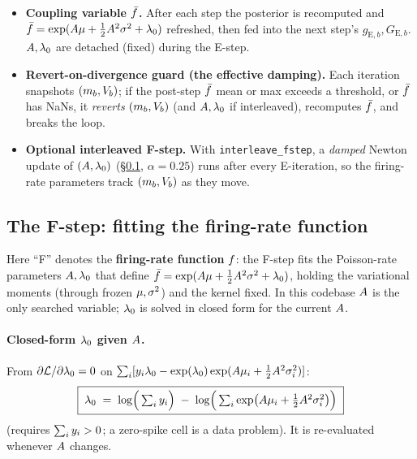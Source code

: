 \begin{itemize}[leftmargin=1.4em,itemsep=1pt]
  \item \textbf{Coupling variable $\bar{f}$.} After each step the posterior is
        recomputed and $\bar{f}=\exp(A\mu+\tfrac12A^2\sigma^{2}+\lambda_{0})$
        refreshed, then fed into the next step's $g_{\mathrm E,b},G_{\mathrm E,b}$.
        $A,\lambda_{0}$ are detached (fixed) during the E-step.
  \item \textbf{Revert-on-divergence guard (the effective damping).} Each iteration
        snapshots $(m_{b},V_{b})$; if the post-step $\bar{f}$ mean or max exceeds a
        threshold, or $\bar{f}$ has NaNs, it \emph{reverts} $(m_{b},V_{b})$ (and
        $A,\lambda_{0}$ if interleaved), recomputes $\bar{f}$, and breaks the loop.
  \item \textbf{Optional interleaved F-step.} With \texttt{interleave\_fstep}, a
        \emph{damped} Newton update of $(A,\lambda_{0})$ (\S\ref{subsec:fstep},
        $\alpha=0.25$) runs after every E-iteration, so the firing-rate parameters
        track $(m_{b},V_{b})$ as they move.
\end{itemize}

\subsection{The F-step: fitting the firing-rate function}
\label{subsec:fstep}

Here ``F'' denotes the \textbf{firing-rate function} $f$: the F-step fits the
Poisson-rate parameters $A,\lambda_{0}$ that define
$\bar{f}=\exp(A\mu+\tfrac12A^2\sigma^{2}+\lambda_{0})$, holding the variational
moments (through frozen $\mu,\sigma^{2}$) and the kernel fixed. In this codebase
$A$ is the only searched variable; $\lambda_{0}$ is solved in closed form for the
current $A$.


\paragraph{Closed-form $\lambda_{0}$ given $A$.}
From $\partial\mathcal{L}/\partial\lambda_{0}=0$ on
$\sum_i[y_i\lambda_{0}-\exp(\lambda_{0})\exp(A\mu_i+\tfrac12A^2\sigma^{2}_i)]$:
\begin{equation}
\boxed{\;
\lambda_{0} \;=\; \log\!\Big(\textstyle\sum_iy_i\Big)
       \;-\; \log\!\Big(\textstyle\sum_i\exp\!\big(A\mu_i+\tfrac12A^2\sigma^{2}_i\big)\Big)
\;}
\label{eq:fstep}
\end{equation}
(requires $\sum_iy_i>0$; a zero-spike cell is a data problem). It is
re-evaluated whenever $A$ changes.

